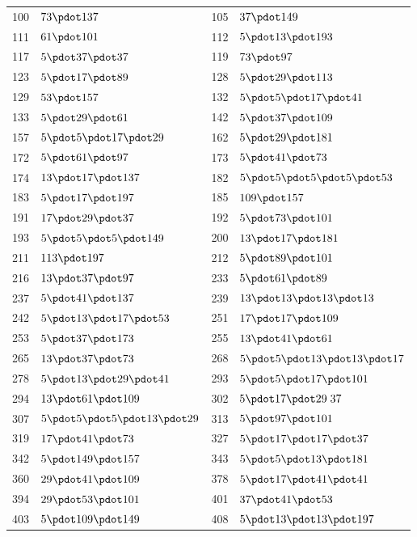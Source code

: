 \begin{longtable}{@{}r|l@{\qquad}r|l@{}}
100 & $73\pdot 137$ & 105 & $37\pdot 149$\\
111 & $61\pdot 101$ & 112 & $5\pdot 13\pdot 193$\\
117 & $5\pdot 37\pdot 37$ & 119 & $73\pdot 97$\\
123 & $5\pdot 17\pdot 89$ & 128 & $5\pdot 29\pdot 113$\\
129 & $53\pdot 157$ & 132 & $5\pdot 5\pdot 17\pdot 41$\\
133 & $5\pdot 29\pdot 61$ & 142 & $5\pdot 37\pdot 109$\\
157 & $5\pdot 5\pdot 17\pdot 29$ & 162 & $5\pdot 29\pdot 181$\\
172 & $5\pdot 61\pdot 97$ & 173 & $5\pdot 41\pdot 73$\\
174 & $13\pdot 17\pdot 137$ & 182 & $5\pdot 5\pdot 5\pdot 5\pdot 53$\\
183 & $5\pdot 17\pdot 197$ & 185 & $109\pdot 157$\\
191 & $17\pdot 29\pdot 37$ & 192 & $5\pdot 73\pdot 101$\\
193 & $5\pdot 5\pdot 5\pdot 149$ & 200 & $13\pdot 17\pdot 181$\\
211 & $113\pdot 197$ & 212 & $5\pdot 89\pdot 101$\\
216 & $13\pdot 37\pdot 97$ & 233 & $5\pdot 61\pdot 89$\\
237 & $5\pdot 41\pdot 137$ & 239 & $13\pdot 13\pdot 13\pdot 13$\\
242 & $5\pdot 13\pdot 17\pdot 53$ & 251 & $17\pdot 17\pdot 109$\\
253 & $5\pdot 37\pdot 173$ & 255 & $13\pdot 41\pdot 61$\\
265 & $13\pdot 37\pdot 73$ & 268 & $5\pdot 5\pdot 13\pdot 13\pdot 17$\\
278 & $5\pdot 13\pdot 29\pdot 41$ & 293 & $5\pdot 5\pdot 17\pdot 101$\\
294 & $13\pdot 61\pdot 109$ & 302 & $5\pdot 17\pdot 29\;37$\\
307 & $5\pdot 5\pdot 5\pdot 13\pdot 29$ & 313 & $5\pdot 97\pdot 101$\\
319 & $17\pdot 41\pdot 73$ & 327 & $5\pdot 17\pdot 17\pdot 37$\\
342 & $5\pdot 149\pdot 157$ & 343 & $5\pdot 5\pdot 13\pdot 181$\\
360 & $29\pdot 41\pdot 109$ & 378 & $5\pdot 17\pdot 41\pdot 41$\\
394 & $29\pdot 53\pdot 101$ & 401 & $37\pdot 41\pdot 53$\\
403 & $5\pdot 109\pdot 149$ & 408 & $5\pdot 13\pdot 13\pdot 197$\\

\end{longtable}
